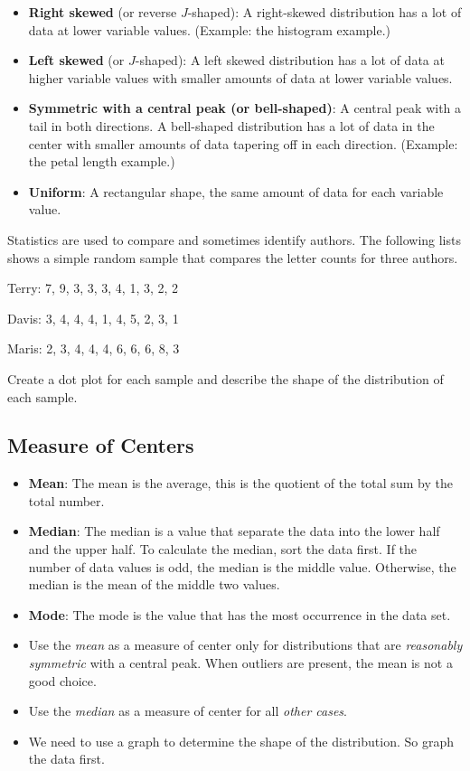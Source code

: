 \begin{itemize}
\item
  \textbf{Right skewed} (or reverse \(J\)-shaped): A right-skewed
  distribution has a lot of data at lower variable values. (Example: the
  histogram example.)
\item
  \textbf{Left skewed} (or \(J\)-shaped): A left skewed distribution has
  a lot of data at higher variable values with smaller amounts of data
  at lower variable values.
\item
  \textbf{Symmetric with a central peak (or bell-shaped)}: A central
  peak with a tail in both directions. A bell-shaped distribution has a
  lot of data in the center with smaller amounts of data tapering off in
  each direction. (Example: the petal length example.)
\item
  \textbf{Uniform}: A rectangular shape, the same amount of data for
  each variable value.
\end{itemize}

\begin{exercise}
Statistics are used to compare and sometimes identify authors. The
following lists shows a simple random sample that compares the letter
counts for three authors.

Terry: 7, 9, 3, 3, 3, 4, 1, 3, 2, 2

Davis: 3, 4, 4, 4, 1, 4, 5, 2, 3, 1

Maris: 2, 3, 4, 4, 4, 6, 6, 6, 8, 3

Create a dot plot for each sample and describe the shape of the
distribution of each sample.
\end{exercise}
\vspace*{5\baselineskip}

\hypertarget{measure-of-centers}{%
\subsection{Measure of Centers}\label{measure-of-centers}}

\begin{itemize}
\item
  \textbf{Mean}: The mean is the average, this is the quotient of the
  total sum by the total number.
\item
  \textbf{Median}: The median is a value that separate the data into the
  lower half and the upper half. To calculate the median, sort the data
  first. If the number of data values is odd, the median is the middle
  value. Otherwise, the median is the mean of the middle two values.
\item
  \textbf{Mode}: The mode is the value that has the most occurrence in
  the data set.
\item
  Use the \emph{mean} as a measure of center only for distributions that
  are \emph{reasonably symmetric} with a central peak. When outliers are
  present, the mean is not a good choice.
\item
  Use the \emph{median} as a measure of center for all \emph{other
  cases}.
\item
  We need to use a graph to determine the shape of the distribution. So
  graph the data first.
\end{itemize}
\vspace*{-\baselineskip}

